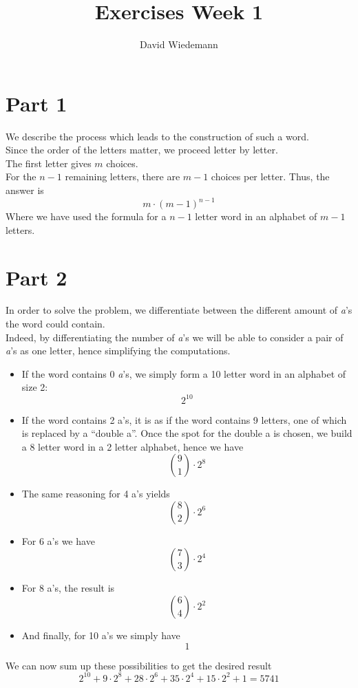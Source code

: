 \documentclass[11pt, a4paper, twoside]{article}
\date{}
\begin{document}
\title{Exercises Week 1}
\author{David Wiedemann}
\maketitle
\section*{Part 1}

We describe the process which leads to the construction of such a word.\\
Since the order of the letters matter, we proceed letter by letter.\\
The first letter gives $m$ choices.\\
For the $n-1$ remaining letters, there are $m-1$ choices per letter.
Thus, the answer is 
\[ 
	m \cdot ( m-1)^{n-1}
\]
Where we have used the formula for a $n-1$ letter word in an alphabet of $m-1$ letters.
\section*{Part 2}
In order to solve the problem, we differentiate between the different amount of \textit{a}'s the word could contain.\\
Indeed, by differentiating the number of \textit{a}'s we will be able to consider a pair of \textit{a}'s as one letter, hence simplifying the computations.\\
\begin{itemize}
	\item If the word contains 0 \textit{a}'s, we simply form a 10 letter word in an alphabet of  size 2:
		\[ 
		2^{10}
		\]
		
	\item If the word contains 2 a's, it is as if the word contains 9 letters, one of which is replaced by a ``double a''. Once the spot for the double a is chosen, we build a 8 letter word in a 2 letter alphabet, hence we have
\[ 
\binom 9 1 \cdot 2^{8}
\]
\item The same reasoning for 4 a's yields
	\[ 
	\binom 8 2 \cdot 2^{6}
	\]

\item For 6 a's we have
	\[ 
	\binom 7 3 \cdot 2^{4}
	\]

\item For 8 a's, the result is
	\[ 
	\binom 6 4 \cdot 2^{2}
	\]

\item And finally, for 10 a's we simply have
	\[ 
	1
	\]
\end{itemize}
We can now sum up these possibilities to get the desired result
\[ 
2^{10} + 9 \cdot 2^{8} + 28 \cdot 2^{6} + 35 \cdot 2^{4} + 15 \cdot 2^{2} + 1 = 5741
\]
\end{document}
